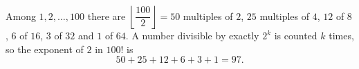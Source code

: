 Among $1,2,\dots,100$ there are $\left\lfloor\dfrac{100}{2}\right\rfloor=50$ multiples of $2$, $25$ multiples of $4$, $12$ of $8$, $6$ of $16$, $3$ of $32$ and $1$ of $64$. A number divisible by exactly $2^k$ is counted $k$ times, so the exponent of $2$ in $100!$ is
\[50+25+12+6+3+1=\boxed{97}.\]
